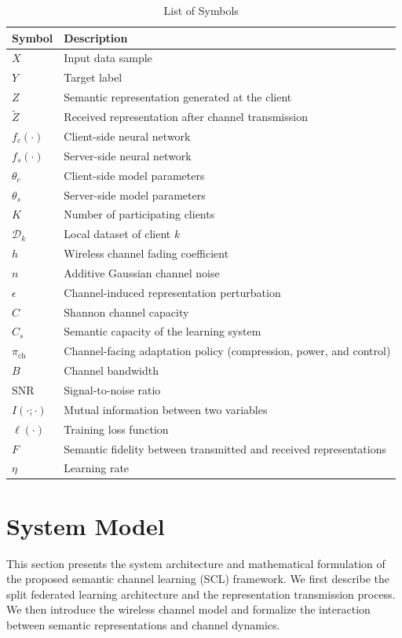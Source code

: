 \documentclass[10pt,journal]{IEEEtran}
\begin{document}
\begin{table}[h]
\centering
\caption{List of Symbols}
\label{tab:notation}
\begin{tabular}{ll}
\toprule
Symbol & Description \\
\midrule
$X$ & Input data sample \\
$Y$ & Target label \\
$Z$ & Semantic representation generated at the client \\
$\tilde{Z}$ & Received representation after channel transmission \\
$f_c(\cdot)$ & Client-side neural network \\
$f_s(\cdot)$ & Server-side neural network \\
$\theta_c$ & Client-side model parameters \\
$\theta_s$ & Server-side model parameters \\
$K$ & Number of participating clients \\
$\mathcal{D}_k$ & Local dataset of client $k$ \\
$h$ & Wireless channel fading coefficient \\
$n$ & Additive Gaussian channel noise \\
$\epsilon$ & Channel-induced representation perturbation \\
$C$ & Shannon channel capacity \\
$C_s$ & Semantic capacity of the learning system \\
$\pi_{\mathrm{ch}}$ & Channel-facing adaptation policy (compression, power, and control) \\
$B$ & Channel bandwidth \\
$\text{SNR}$ & Signal-to-noise ratio \\
$I(\cdot;\cdot)$ & Mutual information between two variables \\
$\ell(\cdot)$ & Training loss function \\
$F$ & Semantic fidelity between transmitted and received representations \\
$\eta$ & Learning rate \\
\bottomrule
\end{tabular}
\end{table}
\section{System Model}
This section presents the system architecture and mathematical formulation of the proposed semantic channel learning (SCL) framework. We first describe the split federated learning architecture and the representation transmission process. We then introduce the wireless channel model and formalize the interaction between semantic representations and channel dynamics.
\end{document}
